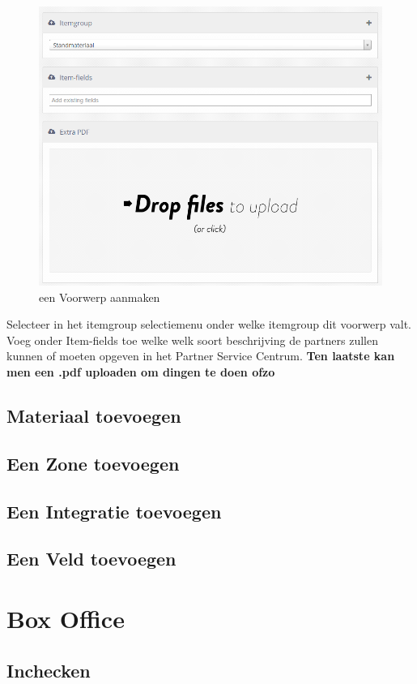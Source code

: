 \documentclass[]{memoir}
\begin{document}
\begin{figure}[H]
	\includegraphics[width=\linewidth]{addItem_right}
	\caption{een Voorwerp aanmaken}
\end{figure}
Selecteer in het itemgroup selectiemenu onder welke itemgroup dit voorwerp valt. 
Voeg onder Item-fields toe welke welk soort beschrijving de partners zullen kunnen of moeten opgeven in het Partner Service Centrum. 
\textbf{Ten laatste kan men een .pdf uploaden om dingen te doen ofzo}
\subsection{Materiaal toevoegen} \label{SetMaterial}
\subsection{Een Zone toevoegen} \label{SetZone}
\subsection{Een Integratie toevoegen} \label{SetIntegration}
\subsection{Een Veld toevoegen} \label{SetField}

\section{Box Office} \label{BoxOfficeInstr}
\subsection{Inchecken} \label{BOCheckIn}
\end{document}

